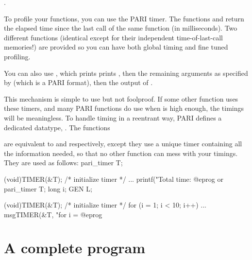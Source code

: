 .

\noindent
To profile your functions, you can use the PARI timer. The functions
 and  return the elapsed time since
the last call of the same function (in milliseconds). Two different
functions (identical except for their independent time-of-last-call
memories!) are provided so you can have both global timing and fine tuned
profiling.

You can also use , which prints
prints , then the remaining arguments as specified by
 (which is a PARI format), then the output of .

This mechanism is simple to use but not foolproof. If some other function
uses these timers, and many PARI functions do use  when
 is high enough, the timings will be meaningless. To handle
timing in a reentrant way, PARI defines a dedicated datatype,
. The functions 



\noindent are equivalent to  and  respectively,
except they use a unique timer  containing all the information needed,
so that no other function can mess with your timings. They are used as
follows:
\bprog
  pari_timer T;

  (void)TIMER(&T); /* initialize timer */
  ...
  printf("Total time: %
@eprog
or
\bprog
  pari_timer T;
  long i;
  GEN L;

  (void)TIMER(&T); /* initialize timer */
  for (i = 1; i < 10; i++) {
    ...
    msgTIMER(&T, "for i = %
  }
@eprog

\section{A complete program}
\label{se:prog}

